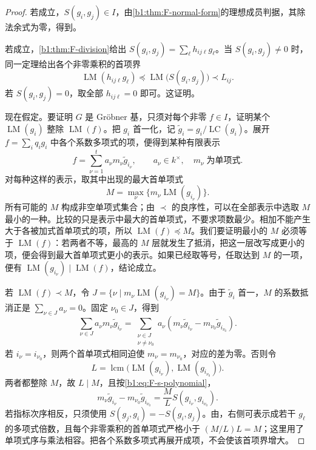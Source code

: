 \begin{proof}
	若成立，\(S(g_i,g_j)\in I\)，由\cref{b1:thm:F-normal-form}的理想成员判据，其除法余式为零，得到。

	若成立，\cref{b1:thm:F-division}给出 \(S(g_i,g_j)=\sum_\ell h_{ij\ell}g_\ell\)。当 \(S(g_i,g_j)\ne0\) 时，同一定理给出各个非零乘积的首项界
	\[
		\operatorname{LM}(h_{ij\ell}g_\ell) \preceq\operatorname{LM}\bigl(S(g_i,g_j)\bigr) \prec L_{ij}.
	\]
	若 \(S(g_i,g_j)=0\)，取全部 \(h_{ij\ell}=0\) 即可。这证明。

	现在假定。要证明 \(G\) 是 Gröbner 基，只须对每个非零 \(f\in I\)，证明某个 \(\operatorname{LM}(g_i)\) 整除 \(\operatorname{LM}(f)\)。把 \(g_i\) 首一化，记 \(\widetilde g_i=g_i/\operatorname{LC}(g_i)\)。展开 \(f=\sum_i q_i g_i\) 中各个系数多项式的项，便得到某种有限表示
	\begin{equation}\label{b1:eq:F-buchberger-minimal-representation}
		f=\sum_{\nu=1}^t a_\nu m_\nu\widetilde g_{i_\nu}, \qquad a_\nu\in k^\times,\quad m_\nu\;\text{为单项式}.
	\end{equation}
	对每种这样的表示，取其中出现的最大首单项式
	\[
		M=\max_\nu\bigl\{m_\nu\operatorname{LM}(g_{i_\nu})\bigr\}.
	\]
	所有可能的 \(M\) 构成非空单项式集合；由 \(\prec\) 的良序性，可以在全部表示中选取 \(M\) 最小的一种。比较的只是表示中最大的首单项式，不要求项数最少。相加不能产生大于各被加式首单项式的项，所以 \(\operatorname{LM}(f)\preceq M\)。我们要证明最小的 \(M\) 必须等于 \(\operatorname{LM}(f)\)：若两者不等，最高的 \(M\) 层就发生了抵消，把这一层改写成更小的项，便会得到最大首单项式更小的表示。如果已经取等号，任取达到 \(M\) 的一项，便有 \(\operatorname{LM}(g_{i_\nu})\mid\operatorname{LM}(f)\)，结论成立。

	若 \(\operatorname{LM}(f)\prec M\)，令 \(J=\bigl\{\nu\mid m_\nu\operatorname{LM}(g_{i_\nu})=M\bigr\}\)。由于 \(\widetilde g_i\) 首一，\(M\) 的系数抵消正是 \(\sum_{\nu\in J}a_\nu=0\)。固定 \(\nu_0\in J\)，得到
	\begin{equation}\label{b1:eq:F-leading-cancellation}
		\sum_{\nu\in J}a_\nu m_\nu\widetilde g_{i_\nu} =\sum_{\substack{\nu\in J\\\nu\ne\nu_0}} a_\nu\left(m_\nu\widetilde g_{i_\nu} -m_{\nu_0}\widetilde g_{i_{\nu_0}}\right).
	\end{equation}
	若 \(i_\nu=i_{\nu_0}\)，则两个首单项式相同迫使 \(m_\nu=m_{\nu_0}\)，对应的差为零。否则令
	\[
		L=\operatorname{lcm}\bigl( \operatorname{LM}(g_{i_\nu}), \operatorname{LM}(g_{i_{\nu_0}})\bigr).
	\]
	两者都整除 \(M\)，故 \(L\mid M\)，且按\eqref{b1:eq:F-s-polynomial}，
	\[
		m_\nu\widetilde g_{i_\nu} -m_{\nu_0}\widetilde g_{i_{\nu_0}} =\frac{M}{L}S(g_{i_\nu},g_{i_{\nu_0}}).
	\]
	若指标次序相反，只须使用 \(S(g_j,g_i)=-S(g_i,g_j)\)。由，右侧可表示成若干 \(g_\ell\) 的多项式倍数，且每个非零乘积的首单项式严格小于 \((M/L)L=M\)；这里用了单项式序与乘法相容。把各个系数多项式再展开成项，不会使该首项界增大。


\end{proof}
